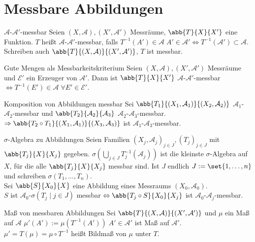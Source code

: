 \section*{Messbare Abbildungen}

\begin{karte}{\( \mathcal{A} \)-\(\mathcal{A}'\)-messbar}
	Seien \( (X, \mathcal{A}), (X', \mathcal{A}') \) Messräume, 
	\( \abb{T}{X}{X'} \) eine Funktion. \(T\) heißt \( \mathcal{A} \)-\(\mathcal{A}'\)-messbar, 
	falls \( T^{-1}(A') \in \mathcal{A} \; A'\in \mathcal{A}' \Leftrightarrow T^{-1}(\mathcal{A}') \subset \mathcal{A} \).
	Schreiben auch \( \abb{T}{(X, \mathcal{A})}{(X', \mathcal{A}')} \), \(T\) ist messbar.
\end{karte}

\begin{karte}{Gute Mengen als Messbarkeitskriterium}
	Seien \( (X, \mathcal{A}), (X', \mathcal{A}') \) Messräume und 
	\( \mathcal{E}' \) ein Erzeuger von \( \mathcal{A}' \). Dann ist 
	\( \abb{T}{X}{X'} \) \( \mathcal{A} \)-\( \mathcal{A}' \)-messbar
	\( \Leftrightarrow T^{-1}(E') \in \mathcal{A} \;\forall E' \in \mathcal{E}' \).
\end{karte}

\begin{karte}{Komposition von Abbildungen messbar}
	Sei \( \abb{T_1}{(X_1, \mathcal{A}_1)}{(X_2, \mathcal{A}_2)} \) \(\mathcal{A}_1\)-
	\(\mathcal{A}_2\)-messbar und \( \abb{T_2}{\mathcal{A}_2}{\mathcal{A}_3} \) 
	\( \mathcal{A}_2 \)-\(\mathcal{A}_3\)-messbar. \\
	\( \Rightarrow \abb{T_2 \circ T_1}{(X_1, \mathcal{A}_1)}{(X_3, \mathcal{A}_3)} \) ist 
	\( \mathcal{A}_1 \)-\(\mathcal{A}_3\)-messbar.
\end{karte}

\begin{karte}{\( \sigma \)-Algebra zu Abbildungen}
	Seien Familien \( (X_j, \mathcal{A}_j)_{j \in J}, (T_j)_{j\in J} \) mit 
	\( \abb{ T_j }{X}{X_j} \) gegeben. \(  \sigma( \bigcup_{j\in J} T_j^{-1}(\mathcal{A}_j) )\) 
	ist die kleinste \( \sigma \)-Algebra auf \(X\), für die alle 
	\( \abb{T_j}{X}{X_j} \) messbar sind. 
	Ist \( J \) endlich \( J := \set{1,\ldots,n} \) und schreiben \( \sigma(T_1,\ldots, T_n) \). \\
	Sei \( \abb{S}{X_0}{X} \) eine Abbildung eines Messraums \( (X_0, \mathcal{A}_0) \). \\
	\(S\) ist \(\mathcal{A}_0\)-\( \sigma(T_j \;|\;j\in J) \) messbar 
	\( \Leftrightarrow \abb{T_j \circ S}{X_0}{X_j} \) ist \(\mathcal{A}_0\)-\(\mathcal{A}_j\)-messbar.
\end{karte}

\begin{karte}{Maß von messbaren Abbildungen}
	Sei \( \abb{T}{(X, \mathcal{A})}{(X', \mathcal{A}')} \) und \(\mu\) ein Maß auf 
	\(\mathcal{A}\) 
	\( \mu'(A') := \mu(T^{-1}(A')) \;A' \in \mathcal{A}' \) ist Maß auf \( \mathcal{A}' \).\\
	\( \mu' = T(\mu) = \mu \circ T^{-1} \) heißt Bildmaß von \( \mu \) unter \(T\).
\end{karte}